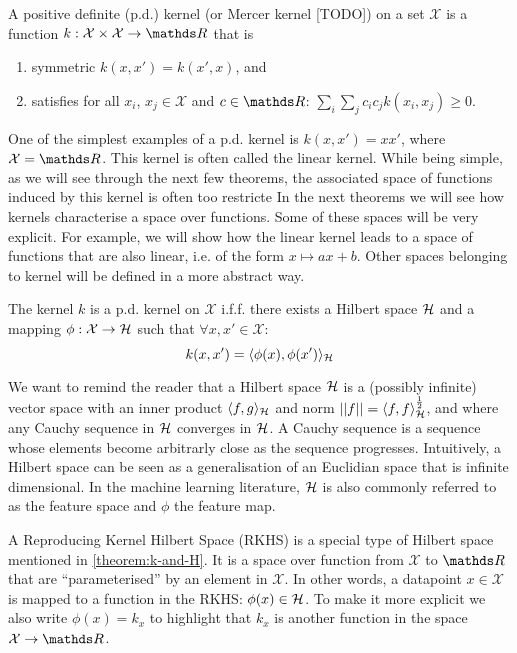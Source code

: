 \begin{definition}
A positive definite (p.d.) kernel (or Mercer kernel [TODO]) on a set $\mathcal{X}$ is a function $k: \mathcal{X} \times \mathcal{X} \rightarrow \Reals$ that is
\begin{enumerate}
  \item symmetric $k(x, x') = k(x', x)$, and
  \item satisfies for all $x_i$, $x_j \in \mathcal{X}$ and $c \in \Reals$: $\sum_{i}\sum_j c_i c_j k(x_i, x_j)\ge 0$.
\end{enumerate}
\end{definition}
One of the simplest examples of a p.d. kernel is $k(x, x') = xx'$, where $\mathcal{X} = \Reals$. This kernel is often called the linear kernel. While being simple, as we will see through the next few theorems, the associated space of functions induced by this kernel is often too restricte
In the next theorems we will see how kernels characterise a space over functions. Some of these spaces will be very explicit. For example, we will show how the linear kernel leads to a space of functions that are also linear, i.e. of the form $x \mapsto a x + b$. Other spaces belonging to kernel will be defined in a more abstract way. 

\begin{theorem}
  \label{theorem:k-and-H}
  The kernel $k$ is a p.d. kernel on $\mathcal{X}$ i.f.f. there exists a Hilbert space ${\mathcal{H}}$ and a mapping $\phi: \mathcal{X} \rightarrow {\mathcal{H}}$ such that $\forall x,x' \in \mathcal{X}$:
  \begin{equation}
    k(x, x') = \langle \phi(x), \phi(x') \rangle_{{\mathcal{H}}}
  \end{equation}
\end{theorem}

We want to remind the reader that a Hilbert space ${\mathcal{H}}$ is a (possibly infinite) vector space with an inner product $\langle f, g \rangle_{{\mathcal{H}}}$ and norm $\lvert\lvert f\rvert\rvert = \langle f, f \rangle_{{\mathcal{H}}}^{\frac{1}{2}}$, and where any Cauchy sequence in ${\mathcal{H}}$ converges in ${\mathcal{H}}$. A Cauchy sequence is a sequence whose elements become arbitrarly close as the sequence progresses. Intuitively, a Hilbert space can be seen as a generalisation of an Euclidian space that is infinite dimensional. In the machine learning literature, ${\mathcal{H}}$ is also commonly referred to as the feature space and $\phi$ the feature map.

A Reproducing Kernel Hilbert Space (RKHS) is a special type of Hilbert space mentioned in \cref{theorem:k-and-H}. It is a space over function from $\mathcal{X}$ to $\Reals$ that are ``parameterised'' by an element in $\mathcal{X}$. In other words, a datapoint $x \in \mathcal{X}$ is mapped to a function in the RKHS: $\phi(x) \in {\mathcal{H}}$. To make it more explicit we also write $\phi(x) = k_x$ to highlight that $k_x$ is another function in the space $\mathcal{X} \rightarrow \Reals$.

